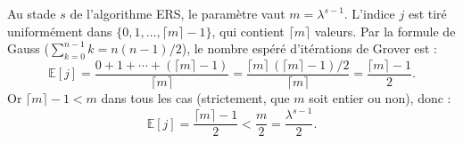 \documentclass{ceri/sty/rapport}
\begin{document}
Au stade $s$ de l'algorithme ERS, le paramètre vaut $m = \lambda^{s-1}$. L'indice $j$ est tiré
uniformément dans $\{0,1,\ldots,\lceil m \rceil - 1\}$, qui contient $\lceil m \rceil$ valeurs. Par la formule de Gauss ($\sum_{k=0}^{n-1} k = n(n-1)/2$), le nombre espéré d'itérations de Grover est :
\[
\mathbb{E}[j]
= \frac{0 + 1 + \cdots + (\lceil m \rceil - 1)}{\lceil m \rceil}
= \frac{\lceil m \rceil\,(\lceil m \rceil - 1)/2}{\lceil m \rceil}
= \frac{\lceil m \rceil - 1}{2}.
\]
Or $\lceil m \rceil - 1 < m$ dans tous les cas (strictement, que $m$ soit entier ou non), donc :
\[
\mathbb{E}[j] = \frac{\lceil m \rceil - 1}{2} < \frac{m}{2} = \frac{\lambda^{s-1}}{2}.
\]
\end{document}
